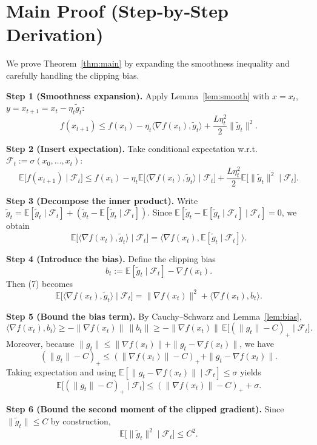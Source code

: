\documentclass{article}
\newcommand{\EE}{\mathbb{E}}
\begin{document}
\section*{Main Proof (Step‑by‑Step Derivation)}
We prove Theorem~\ref{thm:main} by expanding the smoothness inequality and carefully handling the clipping bias.

\noindent\textbf{Step 1 (Smoothness expansion).}  
Apply Lemma~\ref{lem:smooth} with $x=x_t$, $y=x_{t+1}=x_t-\eta_t\tilde g_t$:
\[
f(x_{t+1})\le f(x_t)-\eta_t\langle\nabla f(x_t),\tilde g_t\rangle
          +\frac{L\eta_t^{2}}{2}\|\tilde g_t\|^{2}.
\tag{5}
\]

\noindent\textbf{Step 2 (Insert expectation).}  
Take conditional expectation w.r.t.\ $\mathcal F_t:=\sigma(x_0,\dots,x_t)$:
\[
\EE\!\big[f(x_{t+1})\mid\mathcal F_t\big]
\le f(x_t)-\eta_t\EE\!\big[\langle\nabla f(x_t),\tilde g_t\rangle\mid\mathcal F_t\big]
      +\frac{L\eta_t^{2}}{2}\EE\!\big[\|\tilde g_t\|^{2}\mid\mathcal F_t\big].
\tag{6}
\]

\noindent\textbf{Step 3 (Decompose the inner product).}  
Write $\tilde g_t = \EE[\tilde g_t\mid\mathcal F_t] + (\tilde g_t-\EE[\tilde g_t\mid\mathcal F_t])$.
Since $\EE[\tilde g_t-\EE[\tilde g_t\mid\mathcal F_t]\mid\mathcal F_t]=0$, we obtain
\[
\EE\!\big[\langle\nabla f(x_t),\tilde g_t\rangle\mid\mathcal F_t\big]
   =\Big\langle\nabla f(x_t),\EE[\tilde g_t\mid\mathcal F_t]\Big\rangle .
\tag{7}
\]

\noindent\textbf{Step 4 (Introduce the bias).}  
Define the clipping bias
\[
b_t:=\EE[\tilde g_t\mid\mathcal F_t]-\nabla f(x_t).
\tag{8}
\]
Then (7) becomes
\[
\EE\!\big[\langle\nabla f(x_t),\tilde g_t\rangle\mid\mathcal F_t\big]
   =\|\nabla f(x_t)\|^{2}+\langle\nabla f(x_t),b_t\rangle .
\tag{9}
\]

\noindent\textbf{Step 5 (Bound the bias term).}  
By Cauchy–Schwarz and Lemma~\ref{lem:bias},
\[
\langle\nabla f(x_t),b_t\rangle
   \ge -\|\nabla f(x_t)\|\,\|b_t\|
   \ge -\|\nabla f(x_t)\|\,\EE\!\big[(\|g_t\|-C)_+\mid\mathcal F_t\big].
\tag{10}
\]
Moreover, because $\|g_t\|\le\|\nabla f(x_t)\|+ \|g_t-\nabla f(x_t)\|$, we have
\[
(\|g_t\|-C)_+ \le (\|\nabla f(x_t)\|-C)_+ + \|g_t-\nabla f(x_t)\|.
\tag{11}
\]
Taking expectation and using $\EE[\|g_t-\nabla f(x_t)\|\mid\mathcal F_t]\le\sigma$ yields
\[
\EE\!\big[(\|g_t\|-C)_+\mid\mathcal F_t\big]
   \le (\|\nabla f(x_t)\|-C)_+ + \sigma .
\tag{12}
\]

\noindent\textbf{Step 6 (Bound the second moment of the clipped gradient).}  
Since $\|\tilde g_t\|\le C$ by construction,
\[
\EE\!\big[\|\tilde g_t\|^{2}\mid\mathcal F_t\big]\le C^{2}.
\tag{13}
\]
\end{document}
